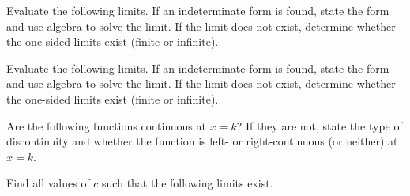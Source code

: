\documentclass{siproblemset}
\begin{document}
    \pagebreak
    \begin{multipartquestion}
        Evaluate the following limits. If an indeterminate form is found, state the form and use algebra to solve the limit. If the limit does not exist, determine whether the one-sided limits exist (finite or infinite).
        \smallspace
        \smallspace
        \smallspace
    \end{multipartquestion}
\pagebreak
    \begin{multipartquestion}
        Evaluate the following limits. If an indeterminate form is found, state the form and use algebra to solve the limit. If the limit does not exist, determine whether the one-sided limits exist (finite or infinite).
        \smallspace
        \smallspace
        \smallspace
    \end{multipartquestion}
    \pagebreak
    
    \begin{multipartquestion}
        Are the following functions continuous at $x=k$? If they are not, state the type of discontinuity and whether the function is left- or right-continuous (or neither) at $x=k$.
        \tinyspace
        \tinyspace
        \tinyspace
        \tinyspace
    \end{multipartquestion}

    \begin{multipartquestion}
        Find all values of $c$ such that the following limits exist.
        \tinyspace
    \end{multipartquestion}
\end{document}
